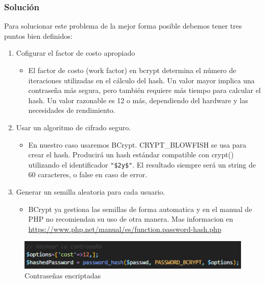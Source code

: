 \documentclass{report}
\begin{document}
                \subsubsection{Solución}
                    Para solucionar este problema de la mejor forma posible debemos tener tres puntos bien definidos:
                    \begin{enumerate}
                        \item Cofigurar el factor de costo apropiado
                        \begin{itemize}
                            \item El factor de costo (work factor) en bcrypt determina el número de iteraciones utilizadas en el cálculo del hash. Un valor mayor implica una contraseña más segura, pero también requiere más tiempo para calcular el hash. Un valor razonable es 12 o más, dependiendo del hardware y las necesidades de rendimiento.
                        \end{itemize}
                        \item Usar un algoritmo de cifrado seguro.
                        \begin{itemize}
                            \item En nuestro caso usaremos BCrypt. CRYPT\_BLOWFISH se usa para crear el hash. Producirá un hash estándar compatible con crypt() utilizando el identificador \texttt{"\$2y\$"}. El resultado siempre será un string de 60 caracteres, o false en caso de error.
                        \end{itemize}
                        \item Generar un semilla aleatoria para cada usuario.
                        \begin{itemize}
                            \item BCrypt ya gestiona las semillas de forma automatica y en el manual de PHP no recomiendan su uso de otra manera. Mas informacion en \url{https://www.php.net/manual/es/function.password-hash.php}
                        \end{itemize}
                    \end{enumerate}
                    \begin{figure}[H]
                        \centering
                        \includegraphics[width=\textwidth]{./img/vulnerabilidades/3.2.3.2.png}
                        \caption{Contraseñas encriptadas}
                    \end{figure}
            \clearpage
\end{document}
